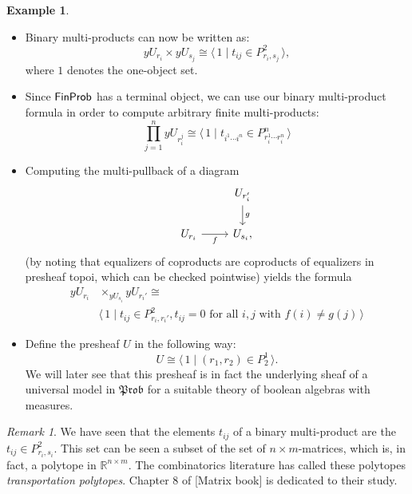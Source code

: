 \documentclass[a4paper]{amsproc}
\theoremstyle{plain}
\theoremstyle{definition}
\newtheorem{example}[theorem]{Example}
\theoremstyle{remark}
\newtheorem{remark}[theorem]{Remark}
\numberwithin{equation}{section}
\newcommand{\y}{\textit{y}}
\newcommand{\FinProb}{\textup{\textsf{FinProb}}}
\newcommand{\Prob}{\mathfrak{Prob}}
\newcommand{\la}{\langle\,}
\newcommand{\ra}{\,\rangle}
\begin{document}
\begin{example} \label{notation_example}
    \begin{itemize}
        \item Binary multi-products can now be written as:
        \[ \y U_{r_i} \times \y U_{s_j} \cong \la 1 \mid t_{ij} \in P^2_{r_i,s_j} \ra, \]
        where $1$ denotes the one-object set.
        \item Since $\FinProb$ has a terminal object, we can use our binary multi-product formula in order to compute arbitrary finite multi-products:
        \[
            \prod_{j=1}^n \y U_{r_i^j} \cong \la 1 \mid t_{i^1 \cdots i^n} \in P^n_{r_i^1 \cdots r_i^n} \ra
        \]
        \item Computing the multi-pullback of a diagram
        \[
            \begin{tikzcd}
            & U_{r'_i} \arrow[d, "g"] \\
            U_{r_i} \arrow[r, "f"'] & U_{s_i} ,
            \end{tikzcd}
        \]
        (by noting that equalizers of coproducts are coproducts of equalizers in presheaf topoi, which can be checked pointwise) yields the formula
        \begin{equation*}
            \begin{split}
            \y U_{r_i} &\times_{\y U_{s_i}} \y U_{r_i'} \cong \\
            &\la 1 \mid t_{ij} \in P^2_{r_i, r_i'}, t_{ij} = 0 \text{ for all } i,j \text{ with } f(i) \neq g(j) \ra
            \end{split}
        \end{equation*}
        \item Define the presheaf $U$ in the following way:
        \[ U \cong \la 1 \mid (r_1,r_2) \in P^1_2 \ra. \]
        We will later see that this presheaf is in fact the underlying sheaf of a universal model in $\Prob$ for a suitable theory of boolean algebras with measures.
    \end{itemize}
\end{example}

\begin{remark} We have seen that the elements $t_{ij}$ of a binary multi-product are the $t_{ij} \in P^2_{r_i,s_i}$. This set can be seen a subset of the set of $n\times m$-matrices, which is, in fact, a polytope in $\mathbb{R}^{n\times m}$. The combinatorics literature has called these polytopes \emph{transportation polytopes}. Chapter 8 of [Matrix book] is dedicated to their study.
\end{remark}
\end{document}
